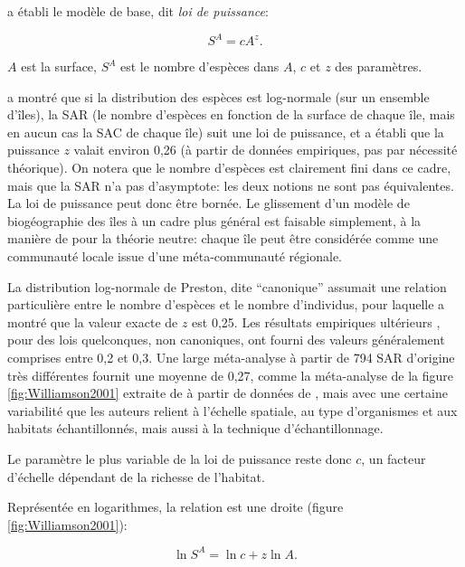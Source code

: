 \documentclass[
  11pt,
  french,
  a4paper,
  extrafontsizes,onecolumn,openright
  ]{memoir}
\newlength{\rf}
\begin{document}
\textcite{Arrhenius1921} a établi le modèle de base, dit \emph{loi de puissance}:

\begin{equation} 
  \label{eq:Arrhenius1921}
  S^{A} = c A^{z}.
\end{equation}

\(A\) est la surface, \(S^{A}\) est le nombre d'espèces dans \(A\), \(c\) et \(z\) des paramètres.

\textcite{Preston1962} a montré que si la distribution des espèces est log-normale (sur un ensemble d'îles), la SAR (le nombre d'espèces en fonction de la surface de chaque île, mais en aucun cas la SAC de chaque île) suit une loi de puissance, et a établi que la puissance \(z\) valait environ 0,26 (à partir de données empiriques, pas par nécessité théorique).
On notera que le nombre d'espèces est clairement fini dans ce cadre, mais que la SAR n'a pas d'asymptote: les deux notions ne sont pas équivalentes.
La loi de puissance peut donc être bornée.
Le glissement d'un modèle de biogéographie des îles à un cadre plus général est faisable simplement, à la manière de \textcite{Hubbell2001} pour la théorie neutre: chaque île peut être considérée comme une communauté locale issue d'une méta-communauté régionale.

La distribution log-normale de Preston, dite \enquote{canonique} assumait une relation particulière entre le nombre d'espèces et le nombre d'individus, pour laquelle \textcite{May1975} a montré que la valeur exacte de \(z\) est 0,25.
Les résultats empiriques ultérieurs \autocite{May1975,May2000}, pour des lois quelconques, non canoniques, ont fourni des valeurs généralement comprises entre 0,2 et 0,3.
Une large méta-analyse \autocite{Drakare2006} à partir de 794 SAR d'origine très différentes fournit une moyenne de 0,27, comme la méta-analyse de la figure \ref{fig:Williamson2001} extraite de \textcite{Williamson2001} à partir de données de \textcite{Lonsdale1999}, mais avec une certaine variabilité que les auteurs relient à l'échelle spatiale, au type d'organismes et aux habitats échantillonnés, mais aussi à la technique d'échantillonnage.

Le paramètre le plus variable de la loi de puissance reste donc \(c\), un facteur d'échelle dépendant de la richesse de l'habitat.

Représentée en logarithmes, la relation est une droite (figure \ref{fig:Williamson2001}):

\begin{equation}
  \label{eq:Arrhenius1921log}
  \ln S^{A} = \ln c + z\ln A.
\end{equation}
\end{document}
